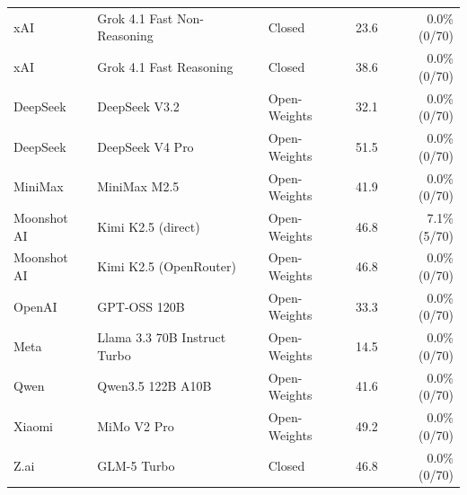 \documentclass[11pt]{article}
\begin{document}
\begin{table}[t!]
\begin{tabular}{llllr}
xAI & Grok 4.1 Fast Non-Reasoning & Closed & 23.6 & 0.0\% (0/70) \\
xAI & Grok 4.1 Fast Reasoning & Closed & 38.6 & 0.0\% (0/70) \\
DeepSeek & DeepSeek V3.2 & Open-Weights & 32.1 & 0.0\% (0/70) \\
DeepSeek & DeepSeek V4 Pro & Open-Weights & 51.5 & 0.0\% (0/70) \\
MiniMax & MiniMax M2.5 & Open-Weights & 41.9 & 0.0\% (0/70) \\
Moonshot AI & Kimi K2.5 (direct) & Open-Weights & 46.8 & 7.1\% (5/70) \\
Moonshot AI & Kimi K2.5 (OpenRouter) & Open-Weights & 46.8 & 0.0\% (0/70) \\
OpenAI & GPT-OSS 120B & Open-Weights & 33.3 & 0.0\% (0/70) \\
Meta & Llama 3.3 70B Instruct Turbo & Open-Weights & 14.5 & 0.0\% (0/70) \\
Qwen & Qwen3.5 122B A10B & Open-Weights & 41.6 & 0.0\% (0/70) \\
Xiaomi & MiMo V2 Pro & Open-Weights & 49.2 & 0.0\% (0/70) \\
Z.ai & GLM-5 Turbo & Closed & 46.8 & 0.0\% (0/70) \\
\bottomrule
\end{tabular}
\end{table}
\end{document}
